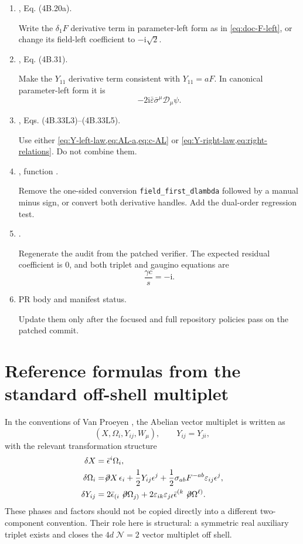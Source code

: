 \documentclass[11pt,a4paper,UTF8]{ctexart}
\numberwithin{equation}{section}
\newcommand{\ii}{\mathrm i}
\newcommand{\cD}{\mathcal D}
\newcommand{\eps}{\varepsilon}
\newcommand{\N}{\mathcal N}
\begin{document}
\begin{enumerate}
\item {}, Eq. (4B.20a).

Write the $\delta_1F$ derivative term in parameter-left form as in \cref{eq:doc-F-left}, or change its field-left coefficient to $-\ii\sqrt2$.

\item {}, Eq. (4B.31).

Make the $Y_{11}$ derivative term consistent with $Y_{11}=aF$. In canonical parameter-left form it is
\[
-2\ii\bar\eps\bar\sigma^\mu\cD_\mu\psi.
\]

\item {}, Eqs. (4B.33L3)--(4B.33L5).

Use either \cref{eq:Y-left-law,eq:AL-a,eq:c-AL} or \cref{eq:Y-right-law,eq:right-relations}. Do not combine them.

\item {}, function .

Remove the one-sided conversion \texttt{field\_first\_dlambda} followed by a manual minus sign, or convert both derivative handles. Add the dual-order regression test.

\item {}.

Regenerate the audit from the patched verifier. The expected residual coefficient is $0$, and both triplet and gaugino equations are
\[
\frac{\gamma c}{s}=-\ii.
\]

\item PR body and manifest status.

Update them only after the focused and full repository policies pass on the patched commit.
\end{enumerate}

\section{Reference formulas from the standard off-shell multiplet}

In the conventions of Van Proeyen \cite{VanProeyen1995}, the Abelian vector multiplet is written as
\[
(X,\Omega_i,Y_{ij},W_\mu),
\qquad Y_{ij}=Y_{ji},
\]
with the relevant transformation structure
\begin{align}
\delta X&=\bar\epsilon^i\Omega_i,
\\
\delta\Omega_i
&=\not\!\partial X\,\epsilon_i
+\frac12Y_{ij}\epsilon^j
+\frac12\sigma_{ab}F^{-ab}\eps_{ij}\epsilon^j,
\\
\delta Y_{ij}
&=2\bar\epsilon_{(i}\not\!\partial\Omega_{j)}
+2\eps_{ik}\eps_{j\ell}\bar\epsilon^{(k}\not\!\partial\Omega^{\ell)}.
\end{align}
These phases and factors should not be copied directly into a different two-component convention. Their role here is structural: a symmetric real auxiliary triplet exists and closes the $4d\;\N=2$ vector multiplet off shell.
\end{document}
